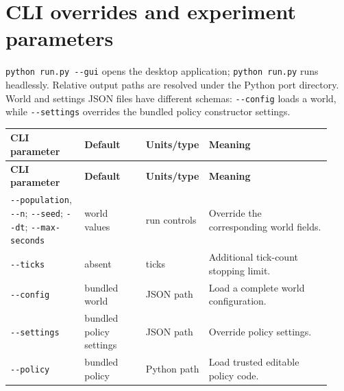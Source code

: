 \documentclass[11pt]{article}
\begin{document}
\section{CLI overrides and experiment parameters}

\texttt{python run.\allowbreak{}py -\allowbreak{}-\allowbreak{}gui} opens the desktop application; \texttt{python run.\allowbreak{}py} runs headlessly. Relative output paths are resolved under the Python port directory. World and settings JSON files have different schemas: \texttt{-\allowbreak{}-\allowbreak{}config} loads a world, while \texttt{-\allowbreak{}-\allowbreak{}settings} overrides the bundled policy constructor settings.


{\small\setlength{\tabcolsep}{4pt}

\begin{longtable}{@{}p{0.23\linewidth}p{0.19\linewidth}p{0.13\linewidth}p{0.38\linewidth}@{}}

\toprule

\textbf{CLI parameter} & \textbf{Default} & \textbf{Units/type} & \textbf{Meaning} \\

\midrule\endfirsthead

\toprule

\textbf{CLI parameter} & \textbf{Default} & \textbf{Units/type} & \textbf{Meaning} \\

\midrule\endhead

\bottomrule\endfoot

\texttt{-\allowbreak{}-\allowbreak{}population}, \texttt{-\allowbreak{}-\allowbreak{}n}; \texttt{-\allowbreak{}-\allowbreak{}seed}; \texttt{-\allowbreak{}-\allowbreak{}dt}; \texttt{-\allowbreak{}-\allowbreak{}max-\allowbreak{}seconds} & world values & run controls & Override the corresponding world fields. \\

\texttt{-\allowbreak{}-\allowbreak{}ticks} & absent & ticks & Additional tick-count stopping limit. \\

\texttt{-\allowbreak{}-\allowbreak{}config} & bundled world & JSON path & Load a complete world configuration. \\

\texttt{-\allowbreak{}-\allowbreak{}settings} & bundled policy settings & JSON path & Override policy settings. \\

\texttt{-\allowbreak{}-\allowbreak{}policy} & bundled policy & Python path & Load trusted editable policy code. \\


\end{longtable}}
\end{document}
